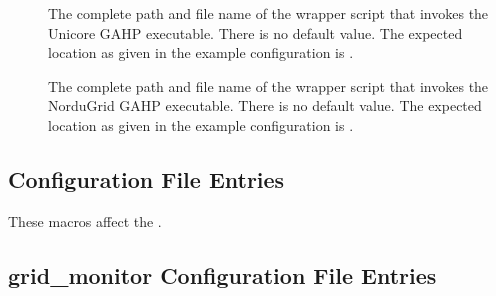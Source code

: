 \begin{description}
\item[]
\label{param:UnicoreGAHP} The complete path and file name of the
wrapper script that invokes the Unicore GAHP executable.
There is no default value. The expected location as given
in the example configuration is .

\item[]
\label{param:NorduGridGAHP} The complete path and file name of the
wrapper script that invokes the NorduGrid GAHP executable.
There is no default value. The expected location as given
in the example configuration is .

\end{description}

\subsection{\label{sec:JobRouter-Config-File-Entries}
Configuration File Entries}

These macros affect the .

\Todo


\subsection{\label{sec:GridMonitor-Config-File-Entries}grid\_monitor
Configuration File Entries}

